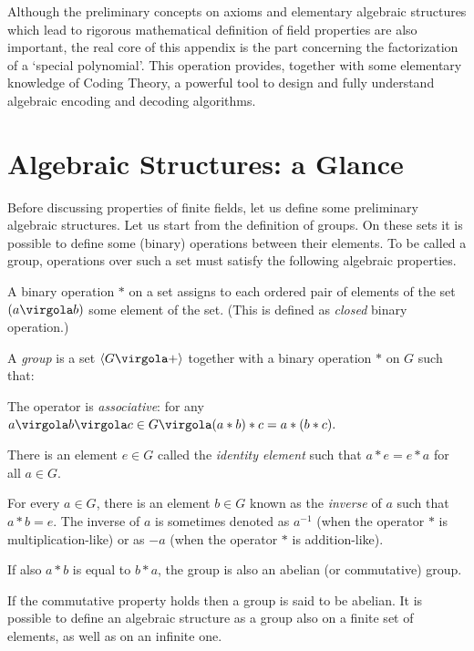 Although the preliminary concepts on axioms and elementary algebraic structures which lead to rigorous mathematical definition of field properties are also important, the real core of this appendix is the part concerning the factorization of a `special polynomial'. This operation provides, together with some elementary knowledge of Coding Theory, a powerful tool to design and fully understand algebraic encoding and decoding algorithms.

\section{Algebraic Structures: a Glance} \label{sec:algebraicstruct}
Before discussing properties of finite fields, let us define some preliminary algebraic structures. Let us start from the definition of groups. On these sets it is possible to define some (binary) operations between their elements. To be called a group, operations over such a set must satisfy the following algebraic properties.

\begin{Def}
A binary operation \(\ast\) on a set assigns to each ordered pair of elements of the set $(a\virgola b)$ some element of the set. (This is defined as \emph{closed} binary operation.)
\end{Def}
\begin{Def}
A \emph{group} is a set $\langle G \virgola + \rangle$ together with a binary operation $\ast$ on $G$ such that:
\itemize
\item[G1] The operator is \emph{associative}: for any \(a \virgola b \virgola c \in G \virgola (a \ast b)\ast c= a \ast (b \ast c).\)
\item[G2] There is an element \(e \in G\) called the \emph{identity element} such that \( a\ast e = e \ast a \) for all \( a \in G\).
\item[G3] For every \( a \in G\), there is an element \(b \in G\) known as the \emph{inverse} of $a$ such that \(a \ast b = e\). The inverse of $a$ is sometimes denoted as \(a^{-1}\) (when the operator $\ast$ is multiplication-like) or as $-a$ (when the operator $\ast$ is addition-like).
\item[G4] If also \( a \ast b  \) is equal to \(b \ast a\), the group is also an abelian (or commutative) group.
\end{Def}
If the commutative property holds then a group is said to be abelian. It is possible to define an algebraic structure as a group also on a finite set of elements, as well as on an infinite one.

